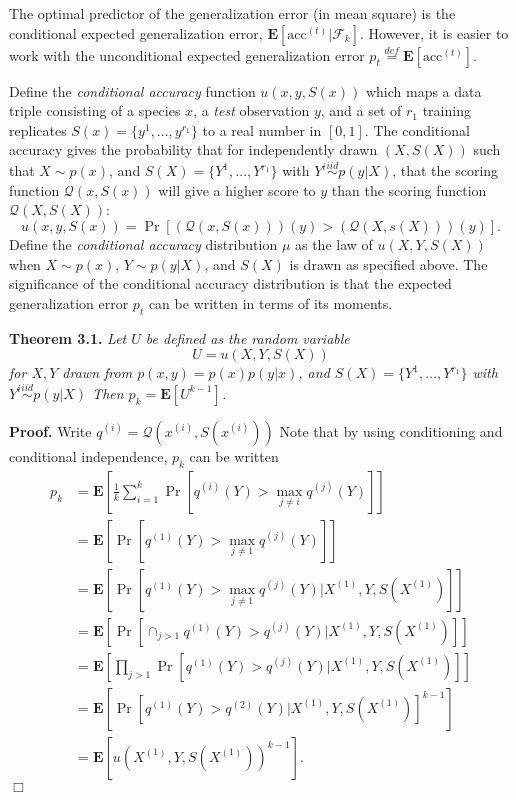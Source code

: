 \documentclass{article}
\newcommand{\E}{\textbf{E}}
\begin{document}
The optimal predictor of the generalization error (in mean square) is
the conditional expected generalization error,
$\E[\text{acc}^{(t)}|\mathcal{F}_k]$.  However, it is easier to work with the
unconditional expected generalization error $p_t \stackrel{def}{=}
\E[\text{acc}^{(t)}]$.

Define the \emph{conditional accuracy} function $u(x, y, S(x))$ which
maps a data triple consisting of a species $x$, a \emph{test}
observation $y$, and a set of $r_1$ training replicates $S(x) =
\{y^{1}, \hdots, y^{r_1}\}$ to a real number in $[0,1]$.  The
conditional accuracy gives the probability that for independently
drawn $(X, S(X))$ such that $X \sim p(x)$, and $S(X) = \{Y^1,\hdots,
Y^{r_1}\}$ with $Y^i \stackrel{iid}{\sim} p(y|X)$, that the scoring
function $\mathcal{Q}(x, S(x))$ will give a higher score to $y$ than
the scoring function $\mathcal{Q}(X, S(X))$:
\[
u(x, y, S(x)) = \Pr[(\mathcal{Q}(x, S(x)))(y) > (\mathcal{Q}(X, s(X)))(y)].
\]
Define the \emph{conditional accuracy} distribution $\mu$ as the law of
$u(X, Y, S(X))$ when $X \sim p(x)$, $Y\sim p(y|X)$, and $S(X)$ is
drawn as specified above.  The significance of the conditional
accuracy distribution is that the expected generalization error $p_t$
can be written in terms of its moments.

\noindent\textbf{Theorem 3.1.} \emph{
Let $U$ be defined as the random variable
\[U = u(X, Y, S(X))\]
for $X, Y$ drawn from $p(x, y) = p(x) p(y|x)$,
and $S(X) = \{Y^1,\hdots, Y^{r_1}\}$ with $Y^i \stackrel{iid}{\sim} p(y|X)$
Then $p_k = \E[U^{k-1}]$.
}

\noindent\textbf{Proof.}  
Write $q^{(i)} = \mathcal{Q}(x^{(i)}, S(x^{(i)}))$
Note that by using conditioning and
conditional independence, $p_k$ can be written
\begin{align*}
p_k &= \E\left[ \frac{1}{k}\sum_{i=1}^k  \Pr[q^{(i)}(Y) > \max_{j\neq i} q^{(j)}(Y)] \right]
\\&= \E\left[ \Pr[q^{(1)}(Y) > \max_{j\neq 1} q^{(j)}(Y)] \right]
\\&= \E[\Pr[q^{(1)}(Y) > \max_{j\neq 1} q^{(j)}(Y)|X^{(1)}, Y, S(X^{(1)})]]
\\&= \E[\Pr[\cap_{j > 1} q^{(1)}(Y) > q^{(j)}(Y)|X^{(1)}, Y, S(X^{(1)})]]
\\&= \E[\prod_{j > 1}\Pr[q^{(1)}(Y) > q^{(j)}(Y)|X^{(1)}, Y, S(X^{(1)})]]
\\&= \E[\Pr[q^{(1)}(Y) > q^{(2)}(Y)|X^{(1)}, Y, S(X^{(1)})]^{k-1}]
\\&= \E[u(X^{(1)}, Y, S(X^{(1)}))^{k-1}].
\end{align*}
$\Box$
\end{document}
